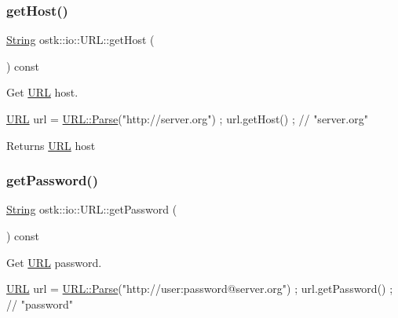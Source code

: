 \subsubsection{\texorpdfstring{get\+Host()}{getHost()}}
{\footnotesize\ttfamily \hyperlink{namespaceostk_1_1io_a95d49b120613a7610cb1b4f03b1116b6}{String} ostk\+::io\+::\+U\+R\+L\+::get\+Host (\begin{DoxyParamCaption}{ }\end{DoxyParamCaption}) const}



Get \hyperlink{classostk_1_1io_1_1_u_r_l}{U\+RL} host. 


\begin{DoxyCode}
\hyperlink{classostk_1_1io_1_1_u_r_l_a2537e046cef4ac966cc295abb81279c2}{URL} url = \hyperlink{classostk_1_1io_1_1_u_r_l_a1cd7216bb1079f62386a218ba510958d}{URL::Parse}(\textcolor{stringliteral}{"http://server.org"}) ;
url.getHost() ; \textcolor{comment}{// "server.org"}
\end{DoxyCode}


\begin{DoxyReturn}{Returns}
\hyperlink{classostk_1_1io_1_1_u_r_l}{U\+RL} host 
\end{DoxyReturn}
\mbox{\label{classostk_1_1io_1_1_u_r_l_aa0a33984e00c87fa1f9c405bffea4c56}} 
\subsubsection{\texorpdfstring{get\+Password()}{getPassword()}}
{\footnotesize\ttfamily \hyperlink{namespaceostk_1_1io_a95d49b120613a7610cb1b4f03b1116b6}{String} ostk\+::io\+::\+U\+R\+L\+::get\+Password (\begin{DoxyParamCaption}{ }\end{DoxyParamCaption}) const}



Get \hyperlink{classostk_1_1io_1_1_u_r_l}{U\+RL} password. 


\begin{DoxyCode}
\hyperlink{classostk_1_1io_1_1_u_r_l_a2537e046cef4ac966cc295abb81279c2}{URL} url = \hyperlink{classostk_1_1io_1_1_u_r_l_a1cd7216bb1079f62386a218ba510958d}{URL::Parse}(\textcolor{stringliteral}{"http://user:password@server.org"}) ;
url.getPassword() ; \textcolor{comment}{// "password"}
\end{DoxyCode}


